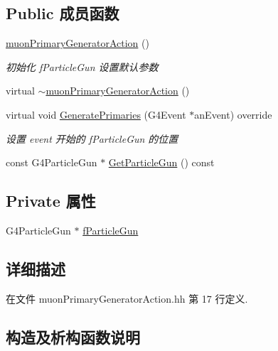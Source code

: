 \subsection*{Public 成员函数}
\begin{DoxyCompactItemize}
\item 
\hyperlink{classmuonPrimaryGeneratorAction_ac30e80019e1a6897863d15d37024bc0a}{muon\+Primary\+Generator\+Action} ()
\begin{DoxyCompactList}\small\item\em 初始化 f\+Particle\+Gun 设置默认参数 \end{DoxyCompactList}\item 
virtual \hyperlink{classmuonPrimaryGeneratorAction_a78341ce17ec299239866432de13d4857}{$\sim$muon\+Primary\+Generator\+Action} ()
\item 
virtual void \hyperlink{classmuonPrimaryGeneratorAction_a885d97924b9fcb69292c33eafb314c60}{Generate\+Primaries} (G4\+Event $\ast$an\+Event) override
\begin{DoxyCompactList}\small\item\em 设置 event 开始的 f\+Particle\+Gun 的位置 \end{DoxyCompactList}\item 
const G4\+Particle\+Gun $\ast$ \hyperlink{classmuonPrimaryGeneratorAction_a2a8edec5c700a748aefbd2ec2a95157a}{Get\+Particle\+Gun} () const
\end{DoxyCompactItemize}
\subsection*{Private 属性}
\begin{DoxyCompactItemize}
\item 
G4\+Particle\+Gun $\ast$ \hyperlink{classmuonPrimaryGeneratorAction_ab2af0b1b3691cf90bb30694eb1cb012f}{f\+Particle\+Gun}
\end{DoxyCompactItemize}


\subsection{详细描述}


在文件 muon\+Primary\+Generator\+Action.\+hh 第 17 行定义.



\subsection{构造及析构函数说明}
\mbox{\label{classmuonPrimaryGeneratorAction_ac30e80019e1a6897863d15d37024bc0a}} 
